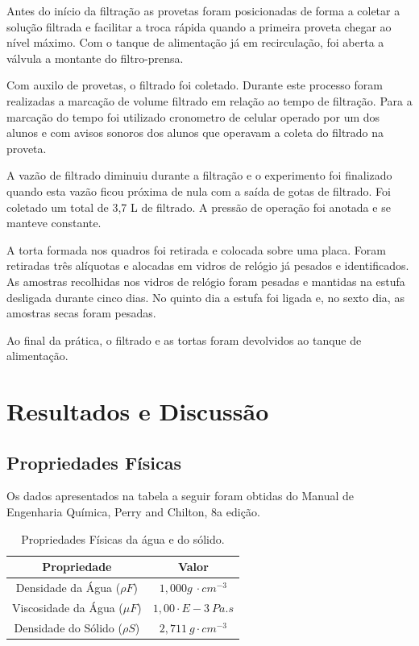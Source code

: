 Antes do início da filtração as provetas foram posicionadas de forma a coletar a solução filtrada e facilitar a troca rápida quando a primeira proveta chegar ao nível máximo. Com o tanque de alimentação já em recirculação, foi aberta a válvula a montante do filtro-prensa.

Com auxilo de provetas, o filtrado foi coletado. Durante este processo foram realizadas a marcação de volume filtrado em relação ao tempo de filtração. Para a marcação do tempo foi utilizado cronometro de celular operado por um dos alunos e com avisos sonoros dos alunos que operavam a coleta do filtrado na proveta.

A vazão de filtrado diminuiu durante a filtração e o experimento foi finalizado quando esta vazão ficou próxima de nula com a saída de gotas de filtrado. Foi coletado um total de 3,7 L de filtrado. A pressão de operação foi anotada e se manteve constante.


A torta formada nos quadros foi retirada e colocada sobre uma placa. Foram retiradas três alíquotas e alocadas em vidros de relógio já pesados e identificados. As amostras recolhidas nos vidros de relógio foram pesadas e mantidas na estufa desligada durante cinco dias. No quinto dia a estufa foi ligada e, no sexto dia, as amostras secas foram pesadas.

Ao final da prática, o filtrado e as tortas foram devolvidos ao tanque de alimentação.



\chapter{Resultados e Discussão}

\section{Propriedades Físicas}

Os dados apresentados na tabela a seguir foram obtidas do Manual de Engenharia Química, Perry and Chilton, 8a edição.

\begin{table}[H]
	\centering
	\begin{tabular}{|c|c|}
		\hline
		\rowcolor[HTML]{DAE8FC} 
		\textbf{Propriedade} & \textbf{Valor} \\ \hline
		Densidade da Água ($\rho F$) & $1,000 g \ \cdot cm^{-3}$ \\ \hline
		Viscosidade da Água ($\mu F$) & $1,00 \cdot E-3 \ Pa.s$ \\ \hline
		Densidade do Sólido ($\rho S$) & $2,711 \ g \cdot cm^{-3}$ \\ \hline
	\end{tabular}
	\caption{Propriedades Físicas da água e do sólido.}
	\label{tab:prop}
\end{table}


